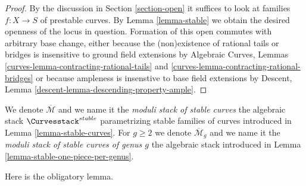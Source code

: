 \begin{proof}
By the discussion in Section \ref{section-open}
it suffices to look at families $f : X \to S$ of
prestable curves. By Lemma \ref{lemma-stable}
we obtain the desired openness of the locus in question.
Formation of this open commutes with arbitrary base change,
either because the (non)existence of rational tails or bridges
is insensitive to ground field extensions by
Algebraic Curves, Lemmas
\ref{curves-lemma-contracting-rational-tails} and
\ref{curves-lemma-contracting-rational-bridges}
or because ampleness is insenstive to base field extensions by
Descent, Lemma \ref{descent-lemma-descending-property-ample}.
\end{proof}

\begin{definition}
\label{definition-deligne-mumford}
\begin{reference}
\cite{DM}
\end{reference}
We denote $\overline{\mathcal{M}}$ and we name it the
{\it moduli stack of stable curves} the algebraic stack
$\Curvesstack^{stable}$ parametrizing stable families of curves
introduced in Lemma \ref{lemma-stable-curves}.
For $g \geq 2$ we denote $\overline{\mathcal{M}}_g$ and we name it the
{\it moduli stack of stable curves of genus $g$}
the algebraic stack introduced in Lemma \ref{lemma-stable-one-piece-per-genus}.
\end{definition}

\noindent
Here is the obligatory lemma.

